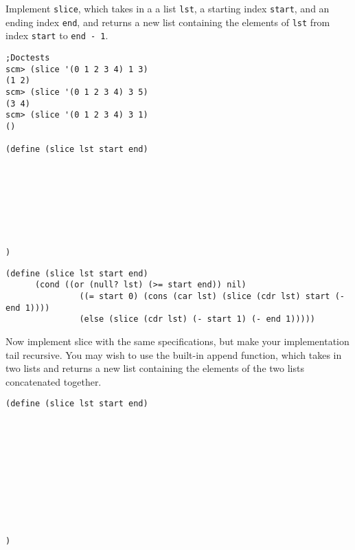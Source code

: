 \begin{blocksection}

\question Implement \texttt{slice}, which takes in a a list \texttt{lst}, a starting index \texttt{start}, and an ending index \texttt{end},
and returns a new list containing the elements of \texttt{lst} from index \texttt{start} to \texttt{end - 1}.

\begin{lstlisting}
;Doctests
scm> (slice '(0 1 2 3 4) 1 3)
(1 2)
scm> (slice '(0 1 2 3 4) 3 5)
(3 4)
scm> (slice '(0 1 2 3 4) 3 1)
()

(define (slice lst start end)
    







)
\end{lstlisting}

\end{blocksection}
\begin{blocksection}

\begin{solution}
\begin{lstlisting}
(define (slice lst start end)
      (cond ((or (null? lst) (>= start end)) nil)
               ((= start 0) (cons (car lst) (slice (cdr lst) start (- end 1))))
               (else (slice (cdr lst) (- start 1) (- end 1)))))
\end{lstlisting}
\end{solution}

\end{blocksection}
\begin{blocksection}

\question Now implement slice with the same specifications, but make your implementation tail recursive.
\newline
You may wish to use the built-in append function, which takes in two lists and returns a 
new list containing the elements of the two lists concatenated together.

\begin{lstlisting}
(define (slice lst start end)
    










)
\end{lstlisting}
\end{blocksection}

